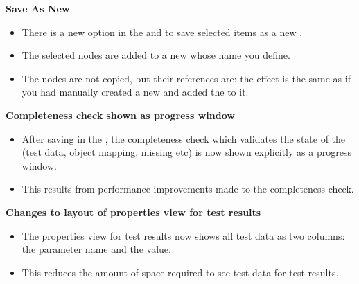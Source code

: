 \textbf{Save As New \gdcase{}}
\begin{itemize}
\item There is a new option in the \gdtestcaseeditor{} and \gdtestsuiteeditor{} to save selected items as a new \gdcase{}.
\item The selected nodes are added to a new \gdcase{} whose name you define.
\item The nodes are not copied, but their references are: the effect is the same as if you had manually created a new \gdcase{} and added the \gdcases{} to it. 
\end{itemize}

\textbf{Completeness check shown as progress window}\\
\begin{itemize}
\item After saving in the \ite{}, the completeness check which validates the state of the \gdproject{} (test data, object mapping, missing \gdcases{} etc) is now shown explicitly as a progress window.
\item This results from performance improvements made to the completeness check.
\end{itemize} 

\textbf{Changes to layout of properties view for test results}\\
\begin{itemize}
\item The properties view for test results now shows all test data as two columns: the parameter name and the value.
\item This reduces the amount of space required to see test data for test results. 
\end{itemize} 
